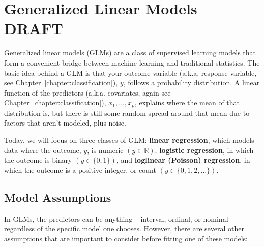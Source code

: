 \chapter{Generalized Linear Models {\color{red} DRAFT} \label{chapter:glms}}

Generalized linear models (GLMs) are a class of supervised learning models that form a convenient bridge between machine learning and traditional statistics. The basic idea behind a GLM is that your outcome variable (a.k.a. response variable, see Chapter~\ref{chapter:classification}), $y$, follows a probability distribution. A linear function of the predictors (a.k.a. covariates, again see Chapter~\ref{chapter:classification}), $x_1, \dots, x_p$, explains where the mean of that distribution is, but there is still some random spread around that mean due to factors that aren't modeled, plus noise.

Today, we will focus on three classes of GLM: \textbf{linear regression}, which models data where the outcome, $y$, is numeric $\left( y \in \mathbb{R} \right)$; \textbf{logistic regression}, in which the outcome is binary $\left( y \in \{0, 1\} \right)$, and \textbf{loglinear (Poisson) regression}, in which the outcome is a positive integer, or count $\left( y \in \{0, 1, 2, \dots\} \right)$. \\


\section{Model Assumptions}

In GLMs, the predictors can be anything -- interval, ordinal, or nominal -- regardless of the specific model one chooses. However, there are several other assumptions that are important to consider before fitting one of these models:

